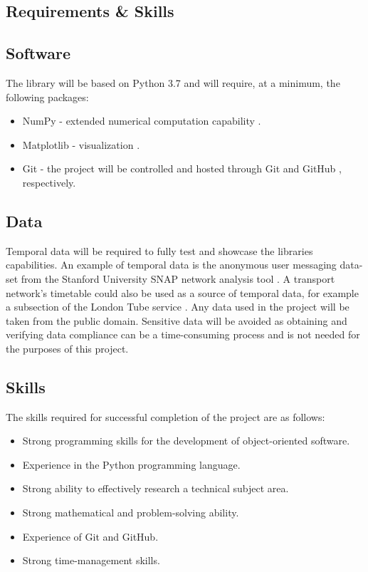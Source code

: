 \begin{requirements}
\section{Requirements \& Skills}
\subsection{Software}
The library will be based on Python 3.7 and will require, at a minimum, the following packages:
\begin{itemize}
  \item NumPy - extended numerical computation capability \cite{numpy}.
  \item Matplotlib - visualization \cite{matplotlib}.
  \item Git - the project will be controlled and hosted through Git \cite{git} and GitHub \cite{github}, respectively.
\end{itemize}
\subsection{Data}
Temporal data will be required to fully test and showcase the libraries capabilities. An example of temporal data is the anonymous user messaging data-set from the Stanford University SNAP network analysis tool \cite{snap_data}. A transport network's timetable could also be used as a source of temporal data, for example a subsection of the London Tube service \cite{tube}.
Any data used in the project will be taken from the public domain. Sensitive data will be avoided as obtaining and verifying data compliance can be a time-consuming process and is not needed for the purposes of this project.
\subsection{Skills}
The skills required for successful completion of the project are as follows:
\begin{itemize}
  \item Strong programming skills for the development of object-oriented software.
  \item Experience in the Python programming language.
  \item Strong ability to effectively research a technical subject area.
  \item Strong mathematical and problem-solving ability.
  \item Experience of Git and GitHub.
  \item Strong time-management skills.
\end{itemize}

\end{requirements}
